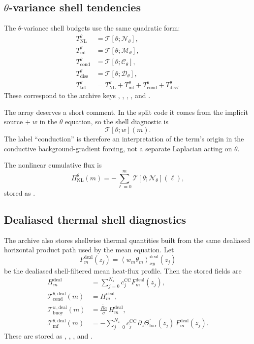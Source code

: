 \documentclass[11pt]{article}
\newcommand{\avg}[1]{\left\langle #1 \right\rangle}
\newcommand{\cc}{c^{\mathrm{CC}}}
\begin{document}
\subsection{\(\theta\)-variance shell tendencies}

The \(\theta\)-variance shell budgets use the same quadratic form:
\begin{align*}
T^{\theta}_{\mathrm{NL}} &= \mathcal{T}[\theta;\mathcal{N}_{\theta}],\\
T^{\theta}_{\mathrm{mf}} &= \mathcal{T}[\theta;\mathcal{M}_{\theta}],\\
T^{\theta}_{\mathrm{cond}} &= \mathcal{T}[\theta;\mathcal{C}_{\theta}],\\
T^{\theta}_{\mathrm{diss}} &= \mathcal{T}[\theta;\mathcal{D}_{\theta}],\\
T^{\theta}_{\mathrm{tot}} &= T^{\theta}_{\mathrm{NL}} + T^{\theta}_{\mathrm{mf}}
+ T^{\theta}_{\mathrm{cond}} + T^{\theta}_{\mathrm{diss}}.
\end{align*}
These correspond to the archive keys
,
,
,
, and
.

The array  deserves a short comment. In the
split code it comes from the implicit source \(+\;w\) in the \(\theta\)
equation, so the shell diagnostic is
\[
\mathcal{T}[\theta; w](m).
\]
The label ``conduction'' is therefore an interpretation of the term's origin in
the conductive background-gradient forcing, not a separate Laplacian acting on
\(\theta\).

The nonlinear cumulative flux is
\[
\Pi^{\theta}_{\mathrm{NL}}(m)
=
-\sum_{\ell=0}^{m}
\mathcal{T}[\theta;\mathcal{N}_{\theta}](\ell),
\]
stored as .

\subsection{Dealiased thermal shell diagnostics}

The archive also stores shellwise thermal quantities built from the same
dealiased horizontal product path used by the mean equation. Let
\[
F_m^{\mathrm{deal}}(z_j)
=
\avg{w_m\theta_m}_{xy}^{\mathrm{deal}}(z_j)
\]
be the dealiased shell-filtered mean heat-flux profile. Then the stored fields
are
\begin{align*}
H_m^{\mathrm{deal}}
&=
\sum_{j=0}^{N_z}\cc_j F_m^{\mathrm{deal}}(z_j),\\
\mathcal{T}^{\theta,\mathrm{deal}}_{\mathrm{cond}}(m)
&=
H_m^{\mathrm{deal}},\\
\mathcal{T}^{w,\mathrm{deal}}_{\mathrm{buoy}}(m)
&=
\frac{\widetilde{Ra}}{\sigma}\,
H_m^{\mathrm{deal}},\\
\mathcal{T}^{\theta,\mathrm{deal}}_{\mathrm{mf}}(m)
&=
-\sum_{j=0}^{N_z}\cc_j\,
\partial_z\Theta_{\mathrm{bar}}^{\prime}(z_j)\,
F_m^{\mathrm{deal}}(z_j).
\end{align*}
These are stored as ,
,
, and
.
\end{document}
